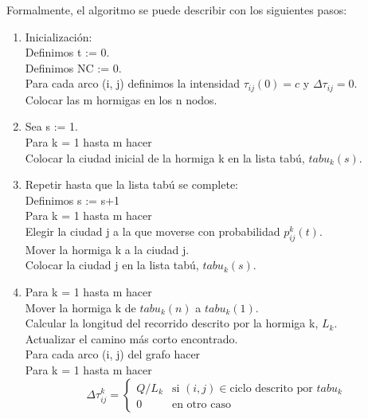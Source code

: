 Formalmente, el algoritmo se puede describir con los siguientes pasos:
\begin{enumerate}
    \item Inicialización: \\
    \hspace*{0.25cm} Definimos t := 0. \\
    \hspace*{0.25cm} Definimos NC := 0. \\
    \hspace*{0.25cm} Para cada arco (i, j) definimos la intensidad $\tau_{ij}(0) = c$ y $\Delta \tau_{ij} = 0$. \\
    \hspace*{0.25cm} Colocar las m hormigas en los n nodos.
    \item Sea s := 1. \\
    Para k = 1 hasta m hacer \\
    \hspace*{0.25cm} Colocar la ciudad inicial de la hormiga k en la lista tabú, $tabu_k(s)$. 

    \item Repetir hasta que la lista tabú se complete: \\
    Definimos s := s+1 \\
    Para k = 1 hasta m hacer \\
    \hspace*{0.25cm} Elegir la ciudad j a la que moverse con probabilidad $p_{ij}^k(t)$. \\
    \hspace*{0.25cm} Mover la hormiga k a la ciudad j. \\
    \hspace*{0.25cm} Colocar la ciudad j en la lista tabú, $tabu_k(s)$. 
    
    \item Para k = 1 hasta m hacer \\
    \hspace*{0.25cm} Mover la hormiga k de $tabu_k(n)$ a $tabu_k(1)$. \\
    \hspace*{0.25cm} Calcular la longitud del recorrido descrito por la hormiga k, $L_k$. \\
    \hspace*{0.25cm} Actualizar el camino más corto encontrado. \\
    \hspace*{0.25cm} Para cada arco (i, j) del grafo hacer \\
    \hspace*{0.25cm} Para k = 1 hasta m hacer 
    \begin{equation*}
        \Delta \tau_{ij}^k = \begin{cases}
        Q / L_k & \text{si } (i, j) \in \text{ciclo descrito por } tabu_k \\
        0 & \text{en otro caso}
        \end{cases}
    \end{equation*}


\end{enumerate}
